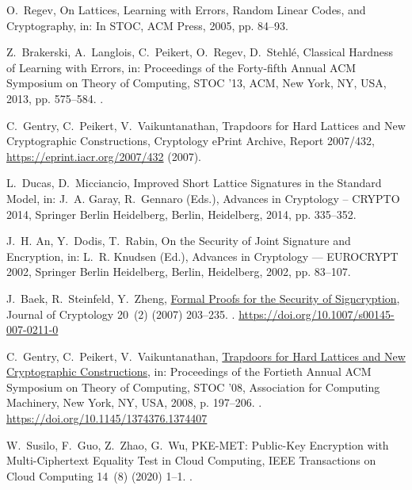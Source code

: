 \documentclass[a4paper,11pt,onecolumn]{elsarticle}
\begin{document}
\begin{thebibliography}{10}
O.~Regev, O{n Lattices, Learning with Errors, Random Linear Codes, and
  Cryptography}, in: In STOC, ACM Press, 2005, pp. 84--93.

Z.~Brakerski, A.~Langlois, C.~Peikert, O.~Regev, D.~Stehl{\'e}, {C}lassical
  {H}ardness of {L}earning with {E}rrors, in: Proceedings of the Forty-fifth
  Annual ACM Symposium on Theory of Computing, STOC '13, ACM, New York, NY,
  USA, 2013, pp. 575--584.
\newblock \href {http://dx.doi.org/10.1145/2488608.2488680}
  {}.

C.~Gentry, C.~Peikert, V.~Vaikuntanathan, {Trapdoors for Hard Lattices and New
  Cryptographic Constructions}, Cryptology ePrint Archive, Report 2007/432,
  \url{https://eprint.iacr.org/2007/432} (2007).

L.~Ducas, D.~Micciancio, {Improved Short Lattice Signatures in the Standard
  Model}, in: J.~A. Garay, R.~Gennaro (Eds.), Advances in Cryptology -- CRYPTO
  2014, Springer Berlin Heidelberg, Berlin, Heidelberg, 2014, pp. 335--352.

J.~H. An, Y.~Dodis, T.~Rabin, {O}n the {S}ecurity of {J}oint {S}ignature and
  {E}ncryption, in: L.~R. Knudsen (Ed.), Advances in Cryptology --- EUROCRYPT
  2002, Springer Berlin Heidelberg, Berlin, Heidelberg, 2002, pp. 83--107.

J.~Baek, R.~Steinfeld, Y.~Zheng,
  \href{https://doi.org/10.1007/s00145-007-0211-0}{{F}ormal {P}roofs for the
  {S}ecurity of {S}igncryption}, Journal of Cryptology 20~(2) (2007) 203--235.
\newblock \href {http://dx.doi.org/10.1007/s00145-007-0211-0}
  {}.
\newline\urlprefix\url{https://doi.org/10.1007/s00145-007-0211-0}

C.~Gentry, C.~Peikert, V.~Vaikuntanathan,
  \href{https://doi.org/10.1145/1374376.1374407}{{Trapdoors for Hard Lattices
  and New Cryptographic Constructions}}, in: Proceedings of the Fortieth Annual
  ACM Symposium on Theory of Computing, STOC ’08, Association for Computing
  Machinery, New York, NY, USA, 2008, p. 197–206.
\newblock \href {http://dx.doi.org/10.1145/1374376.1374407}
  {}.
\newline\urlprefix\url{https://doi.org/10.1145/1374376.1374407}

W.~Susilo, F.~Guo, Z.~Zhao, G.~Wu, {PKE-MET: Public-Key Encryption with
  Multi-Ciphertext Equality Test in Cloud Computing}, IEEE Transactions on
  Cloud Computing 14~(8) (2020) 1--1.
\newblock \href {http://dx.doi.org/10.1109/tcc.2020.2990201}
  {}.

\end{thebibliography}






		
		
	
\end{document}
